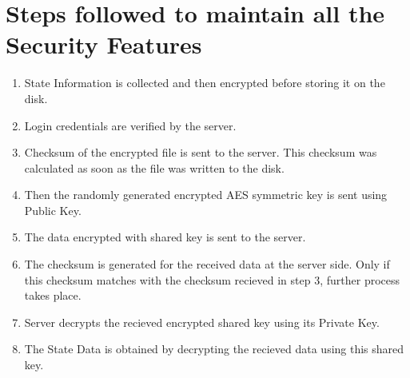 \documentclass[a4paper,12pt,oneside]{book}
\begin{document}
\newpage

\chapter[Project Tag]{Steps followed to maintain all the Security Features}

\begin{enumerate}

\item State Information is collected and then encrypted before storing it on the disk.
\item Login credentials are verified by the server.
\item Checksum of the encrypted file is sent to the server. This checksum was calculated as soon as the file was written to the disk.
\item Then the randomly generated encrypted AES symmetric key is sent using Public Key.
\item The data encrypted with shared key is sent to the server.
\item The checksum is generated for the received data at the server side. Only if this checksum matches with the checksum recieved in step 3, further process takes place.
\item Server decrypts the recieved encrypted shared key using its Private Key.
\item The State Data is obtained by decrypting the recieved data using this shared key.

\end{enumerate}
\end{document}
